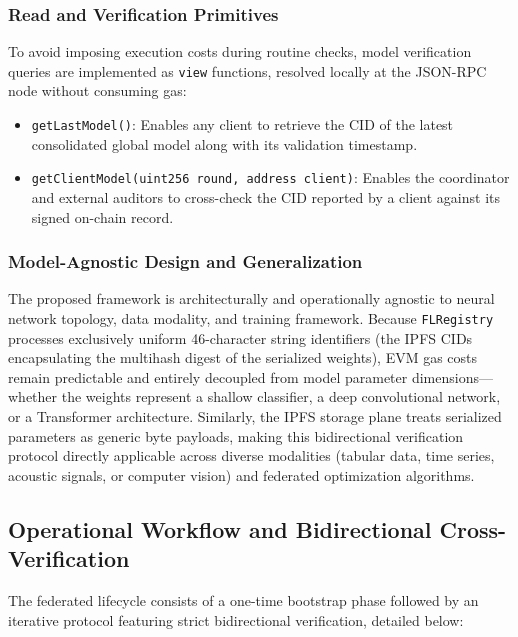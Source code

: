 \subsubsection{Read and Verification Primitives}
To avoid imposing execution costs during routine checks, model verification queries are implemented as \texttt{view} functions, resolved locally at the JSON-RPC node without consuming gas:
\begin{itemize}
    \item \texttt{getLastModel()}: Enables any client to retrieve the CID of the latest consolidated global model along with its validation timestamp.
    \item \texttt{getClientModel(uint256 round, address client)}: Enables the coordinator and external auditors to cross-check the CID reported by a client against its signed on-chain record.
\end{itemize}

\subsubsection{Model-Agnostic Design and Generalization}
The proposed framework is architecturally and operationally agnostic to neural network topology, data modality, and training framework. Because \texttt{FLRegistry} processes exclusively uniform 46-character string identifiers (the IPFS CIDs encapsulating the multihash digest of the serialized weights), EVM gas costs remain predictable and entirely decoupled from model parameter dimensions—whether the weights represent a shallow classifier, a deep convolutional network, or a Transformer architecture. Similarly, the IPFS storage plane treats serialized parameters as generic byte payloads, making this bidirectional verification protocol directly applicable across diverse modalities (tabular data, time series, acoustic signals, or computer vision) and federated optimization algorithms.

\subsection{Operational Workflow and Bidirectional Cross-Verification}
The federated lifecycle consists of a one-time bootstrap phase followed by an iterative protocol featuring strict bidirectional verification, detailed below:

